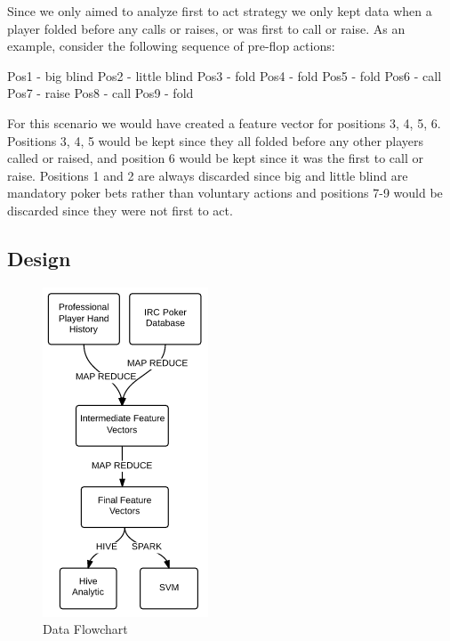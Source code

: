 \documentclass[twoside]{article}
\begin{document}
\begin{multicols}{2}
Since we only aimed to analyze first to act strategy we only kept data when a player folded before any calls or raises, or was first to call or raise. As an example, consider the following sequence of pre-flop actions: \newline

Pos1 - big blind\newline
\indent Pos2 - little blind\newline
\indent Pos3 - fold\newline
\indent Pos4 - fold\newline
\indent Pos5 - fold\newline
\indent Pos6 - call\newline
\indent Pos7 - raise\newline
\indent Pos8 - call\newline
\indent Pos9 - fold\newline

For this scenario we would have created a feature vector for positions 3, 4, 5, 6. Positions 3, 4, 5 would be kept since they all folded before any other players called or raised, and position 6 would be kept since it was the first to call or raise. 
Positions 1 and 2 are always discarded since big and little blind are mandatory poker bets rather than voluntary actions and positions 7-9 would be discarded since they were not first to act. 

\subsection{Design}

\begin{figure}[H]
  \centering
  \centerline{\includegraphics[width=0.45\columnwidth]{Flowchart.png}}
   \caption{Data Flowchart}
  \label{fig:Data flow}
\end{figure}


\end{multicols}
\end{document}
